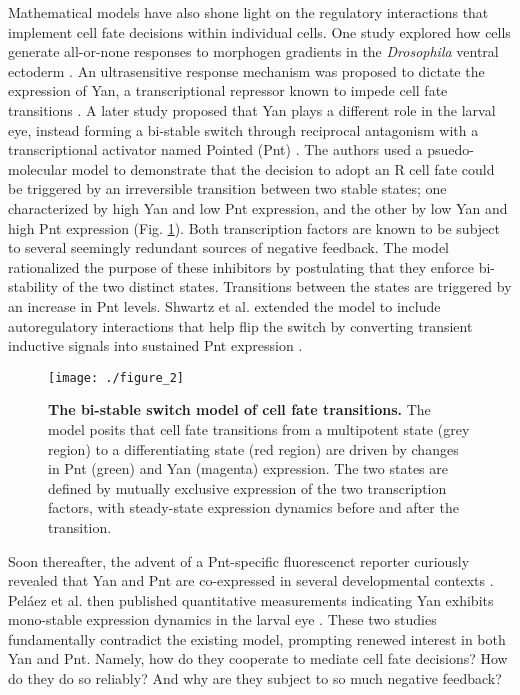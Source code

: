 Mathematical models have also shone light on the regulatory interactions that implement cell fate decisions within individual cells. One study explored how cells generate all-or-none responses to morphogen gradients in the \emph{Drosophila} ventral ectoderm \cite{Melen2005}. An ultrasensitive response mechanism was proposed to dictate the expression of Yan, a transcriptional repressor known to impede cell fate transitions \cite{Lai1992a,Rogge1995,Rebay1995}. A later study proposed that Yan plays a different role in the larval eye, instead forming a bi-stable switch through reciprocal antagonism with a transcriptional activator named Pointed (Pnt) \cite{Graham2010}. The authors used a psuedo-molecular model to demonstrate that the decision to adopt an R cell fate could be triggered by an irreversible transition between two stable states; one characterized by high Yan and low Pnt expression, and the other by low Yan and high Pnt expression (Fig. \ref{fig:intro:bistable}). Both transcription factors are known to be subject to several seemingly redundant sources of negative feedback. The model rationalized the purpose of these inhibitors by postulating that they enforce bi-stability of the two distinct states. Transitions between the states are triggered by an increase in Pnt levels. Shwartz et al. extended the model to include autoregulatory interactions that help flip the switch by converting transient inductive signals into sustained Pnt expression \cite{Shwartz2013}.

\begin{figure}[h!]
\centering
\texttt{[image: ./figure\_2]}
\caption[The bi-stable switch model of cell fate transitions.]{\textbf{The bi-stable switch model of cell fate transitions.} The model posits that cell fate transitions from a multipotent state (grey region) to a differentiating state (red region) are driven by changes in Pnt (green) and Yan (magenta) expression. The two states are defined by mutually exclusive expression of the two transcription factors, with steady-state expression dynamics before and after the transition.}
\label{fig:intro:bistable}
\end{figure}

Soon thereafter, the advent of a Pnt-specific fluorescenct reporter curiously revealed that Yan and Pnt are co-expressed in several developmental contexts \cite{BoisclairLachance2014}. Pel\'{a}ez et al. then published quantitative measurements indicating Yan exhibits  mono-stable expression dynamics in the larval eye \cite{Pelaez2015a}. These two studies fundamentally contradict the existing model, prompting renewed interest in both Yan and Pnt. Namely, how do they cooperate to mediate cell fate decisions? How do they do so reliably? And why are they subject to so much negative feedback?

